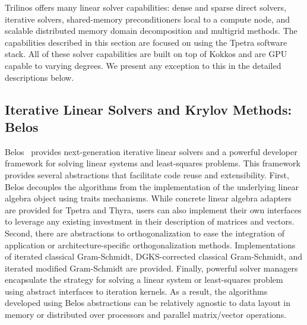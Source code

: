%

Trilinos offers many linear solver capabilities: dense and sparse direct solvers, iterative solvers, shared-memory preconditioners local to a compute node, and scalable distributed memory domain decomposition and multigrid methods. The capabilities described in this section are focused on using the Tpetra software stack. All of these solver capabilities are built on top of Kokkos and are GPU capable to varying degrees. We present any exception to this in the detailed descriptions below.

\subsection{Iterative Linear Solvers and Krylov Methods: Belos}

Belos~\cite{Bavier2012a} provides next-generation iterative linear solvers and 
a powerful developer framework for solving linear systems and least-squares problems.
This framework provides several abstractions that facilitate code reuse and extensibility.
First, Belos decouples the algorithms from the implementation of the underlying linear
algebra object using traits mechanisms.  While concrete linear algebra adapters are provided
for Tpetra and Thyra, users can also implement their own interfaces to leverage any
existing investment in their description of matrices and vectors.  Second, there are abstractions
to orthogonalization to ease the integration of application or architecture-specific orthogonalization
methods. Implementations of iterated classical Gram-Schmidt, DGKS-corrected classical Gram-Schmidt,
and iterated modified Gram-Schmidt are provided.  Finally, powerful solver managers encapsulate the 
strategy for solving a linear system or least-squares problem using abstract interfaces to iteration 
kernels.  As a result, the algorithms developed using Belos abstractions can be relatively agnostic
to data layout in memory or distributed over processors and parallel matrix/vector operations.

